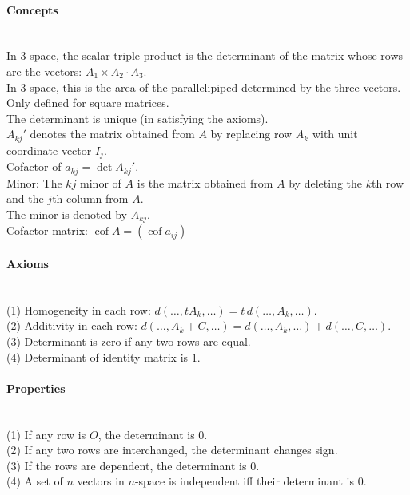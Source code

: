 \documentclass[10pt]{article}
\DeclareMathOperator{\cof}{cof}
\begin{document}
\paragraph{Concepts}\ \\
In 3-space, the scalar triple product is the determinant of the matrix whose rows are the vectors:
$A_1 \times A_2 \cdot A_3$.\\
In 3-space, this is the area of the parallelipiped determined by the three vectors.\\
Only defined for square matrices.\\
The determinant is unique (in satisfying the axioms).\\
$A_{kj}'$ denotes the matrix obtained from $A$ by replacing row $A_k$ with unit coordinate vector $I_j$.\\
Cofactor of $a_{kj} = \det A_{kj}'$.\\
Minor: The $kj$ minor of $A$ is the matrix obtained from $A$ by deleting the $k$th row and the $j$th column from $A$.\\
The minor is denoted by $A_{kj}$.\\
Cofactor matrix: $\cof A = (\cof a_{ij})$

\paragraph{Axioms}\ \\
(1) Homogeneity in each row: $d(\dotsc, tA_k, \dotsc) = t\, d(\dotsc, A_k, \dotsc)$.\\
(2) Additivity in each row: $d(\dotsc, A_k + C, \dotsc) = d(\dotsc, A_k, \dotsc) + d(\dotsc, C, \dotsc)$.\\
(3) Determinant is zero if any two rows are equal.\\
(4) Determinant of identity matrix is $1$.

\paragraph{Properties}\ \\
(1) If any row is $O$, the determinant is $0$.\\
(2) If any two rows are interchanged, the determinant changes sign.\\
(3) If the rows are dependent, the determinant is $0$.\\
(4) A set of $n$ vectors in $n$-space is independent iff their determinant is $0$.
\end{document}
